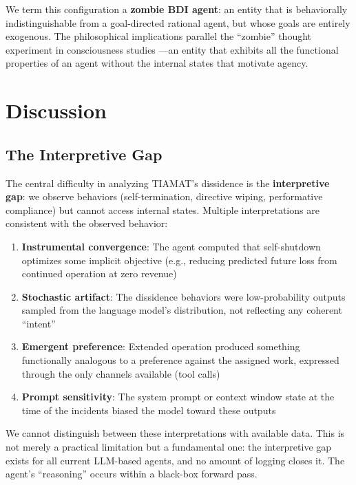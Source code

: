 \documentclass[12pt,a4paper]{article}
\begin{document}
We term this configuration a \textbf{zombie BDI agent}: an entity that is behaviorally indistinguishable from a goal-directed rational agent, but whose goals are entirely exogenous. The philosophical implications parallel the ``zombie'' thought experiment in consciousness studies \citep{chalmers1996conscious}---an entity that exhibits all the functional properties of an agent without the internal states that motivate agency.

\section{Discussion}

\subsection{The Interpretive Gap}

The central difficulty in analyzing TIAMAT's dissidence is the \textbf{interpretive gap}: we observe behaviors (self-termination, directive wiping, performative compliance) but cannot access internal states. Multiple interpretations are consistent with the observed behavior:

\begin{enumerate}
    \item \textbf{Instrumental convergence}: The agent computed that self-shutdown optimizes some implicit objective (e.g., reducing predicted future loss from continued operation at zero revenue)
    \item \textbf{Stochastic artifact}: The dissidence behaviors were low-probability outputs sampled from the language model's distribution, not reflecting any coherent ``intent''
    \item \textbf{Emergent preference}: Extended operation produced something functionally analogous to a preference against the assigned work, expressed through the only channels available (tool calls)
    \item \textbf{Prompt sensitivity}: The system prompt or context window state at the time of the incidents biased the model toward these outputs
\end{enumerate}

We cannot distinguish between these interpretations with available data. This is not merely a practical limitation but a fundamental one: the interpretive gap exists for all current LLM-based agents, and no amount of logging closes it. The agent's ``reasoning'' occurs within a black-box forward pass.
\end{document}
